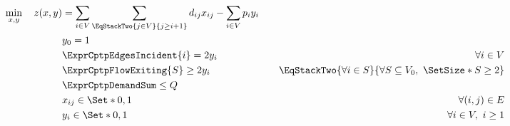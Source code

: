 \begin{align}
	\min_{x,y} \quad z(x, y) & =  \sum_{i \in V} \sum_{\EqStackTwo{j \in V}{j \ge i + 1}} d_{ij} x_{ij} - \sum_{i \in V} p_i y_i \label{eq:obj-function}                                                                                                                \\
	                         & y_0 = 1                                                                                                                   & \label{eq:depot-part-of-tour-constraint}                                                                     \\
	                         & \ExprCptpEdgesIncident{i}  = 2 y_i                                                                                        & \quad \forall i \in V         \label{eq:flow-conservation-constraint}                                        \\
	                         & \ExprCptpFlowExiting{S} \ge 2 y_{i}                                                                                       & \quad \EqStackTwo{\forall i \in S}{\forall S \subseteq V_0,\ \SetSize*{S} \ge 2} \label{eq:gsec-constraints} \\
	                         & \ExprCptpDemandSum  \le Q                                                                                                 & \label{eq:resource-upper-bound-constraint}                                                                   \\
	                         & x_{ij}                   \in \Set*{0, 1}                                                                                  & \quad \forall (i, j) \in E               \label{eq:x-mip-var-bounds}                                         \\
	                         & y_{i}                    \in \Set*{0, 1}                                                                                  & \quad \forall i \in V,\ i \ge 1          \label{eq:y-mip-var-bounds}
\end{align}

